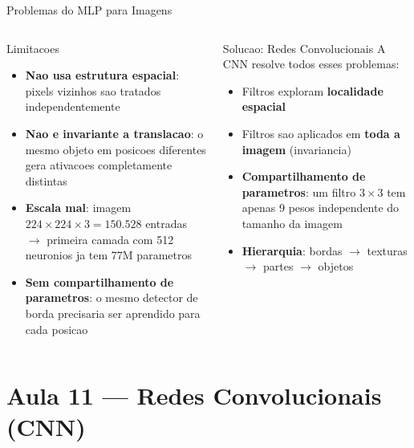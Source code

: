 \documentclass[aspectratio=169, 10pt]{beamer}
\begin{document}

\begin{frame}{Problemas do MLP para Imagens}
\begin{columns}
\begin{alertblock}{Limitacoes}
  \begin{itemize}
    \item \textbf{Nao usa estrutura espacial}: pixels vizinhos sao tratados 
          independentemente
    \item \textbf{Nao e invariante a translacao}: o mesmo objeto em posicoes 
          diferentes gera ativacoes completamente distintas
    \item \textbf{Escala mal}: imagem $224 \times 224 \times 3 = 150.528$ 
          entradas $\to$ primeira camada com 512 neuronios ja tem 77M parametros
    \item \textbf{Sem compartilhamento de parametros}: o mesmo detector de 
          borda precisaria ser aprendido para cada posicao
  \end{itemize}
\end{alertblock}

\begin{exampleblock}{Solucao: Redes Convolucionais}
  A CNN resolve todos esses problemas:
  \begin{itemize}
    \item Filtros exploram \textbf{localidade espacial}
    \item Filtros sao aplicados em \textbf{toda a imagem} (invariancia)
    \item \textbf{Compartilhamento de parametros}: um filtro $3\times3$ 
          tem apenas 9 pesos independente do tamanho da imagem
    \item \textbf{Hierarquia}: bordas $\to$ texturas $\to$ partes $\to$ objetos
  \end{itemize}
\end{exampleblock}
\end{columns}
\end{frame}

\section{Aula 11 — Redes Convolucionais (CNN)}
\end{document}
